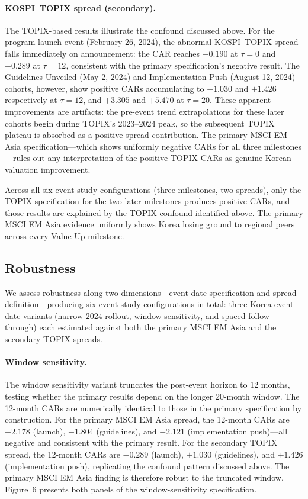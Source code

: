 \paragraph{KOSPI--TOPIX spread (secondary).} The TOPIX-based results illustrate the confound discussed above. For the program launch event (February 26, 2024), the abnormal KOSPI--TOPIX spread falls immediately on announcement: the CAR reaches $-0.190$ at $\tau = 0$ and $-0.289$ at $\tau = 12$, consistent with the primary specification's negative result. The Guidelines Unveiled (May 2, 2024) and Implementation Push (August 12, 2024) cohorts, however, show positive CARs accumulating to $+1.030$ and $+1.426$ respectively at $\tau = 12$, and $+3.305$ and $+5.470$ at $\tau = 20$. These apparent improvements are artifacts: the pre-event trend extrapolations for these later cohorts begin during TOPIX's 2023--2024 peak, so the subsequent TOPIX plateau is absorbed as a positive spread contribution. The primary MSCI EM Asia specification---which shows uniformly negative CARs for all three milestones---rules out any interpretation of the positive TOPIX CARs as genuine Korean valuation improvement.

Across all six event-study configurations (three milestones, two spreads), only the TOPIX specification for the two later milestones produces positive CARs, and those results are explained by the TOPIX confound identified above. The primary MSCI EM Asia evidence uniformly shows Korea losing ground to regional peers across every Value-Up milestone.

\subsection{Robustness}

We assess robustness along two dimensions---event-date specification and spread definition---producing six event-study configurations in total: three Korea event-date variants (narrow 2024 rollout, window sensitivity, and spaced follow-through) each estimated against both the primary MSCI EM Asia and the secondary TOPIX spreads.

\paragraph{Window sensitivity.} The window sensitivity variant truncates the post-event horizon to 12 months, testing whether the primary results depend on the longer 20-month window. The 12-month CARs are numerically identical to those in the primary specification by construction. For the primary MSCI EM Asia spread, the 12-month CARs are $-2.178$ (launch), $-1.804$ (guidelines), and $-2.121$ (implementation push)---all negative and consistent with the primary result. For the secondary TOPIX spread, the 12-month CARs are $-0.289$ (launch), $+1.030$ (guidelines), and $+1.426$ (implementation push), replicating the confound pattern discussed above. The primary MSCI EM Asia finding is therefore robust to the truncated window. Figure~6 presents both panels of the window-sensitivity specification.

